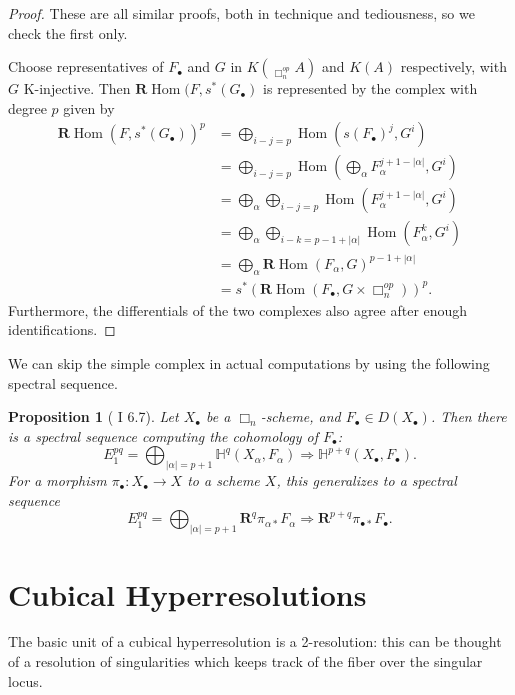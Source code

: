 \documentclass[proquest]{uwthesis}[2014/11/13]
\newtheorem{prop}[theorem]{Proposition}
\theoremstyle{definition}
\DeclareMathOperator{\Diag}{\underline{Diag}}
\DeclareMathOperator{\Hom}{Hom}
\newcommand{\HH}{\mathbb{H}}
\newcommand{\bR}{\textbf{R}}
\begin{document}
\begin{proof}
	These are all similar proofs, both in technique and tediousness, so we check the first only.
	
	Choose representatives of $F_\bullet$ and $G$ in $K(\Diag_{\Box_n^{op}} A)$ and $K(A)$ respectively, with $G$ K-injective.
	Then $\bR \Hom(F, s^* (G_\bullet)$ is represented by the complex with degree $p$ given by
	\begin{align*}
		\bR \Hom(F, s^* (G_\bullet))^p &= \bigoplus_{i-j = p} \Hom(s(F_\bullet)^j, G^i) \\
		&= \bigoplus_{i-j = p} \Hom(\bigoplus_\alpha F_\alpha^{j + 1 - |\alpha|}, G^i) \\
		&= \bigoplus_\alpha \bigoplus_{i-j = p} \Hom(F_\alpha^{j + 1 - |\alpha|}, G^i) \\
		&= \bigoplus_\alpha \bigoplus_{i-k = p - 1 + |\alpha|} \Hom(F_\alpha^k, G^i) \\
		&= \bigoplus_\alpha \bR \Hom(F_\alpha, G)^{p-1+|\alpha|} \\
		&= s^* (\bR \Hom(F_\bullet, G \times \Box_n^{op}))^p.
	\end{align*}
	Furthermore, the differentials of the two complexes also agree after enough identifications.
\end{proof}

We can skip the simple complex in actual computations by using the following spectral sequence.

\begin{prop}[\cite{Guillen1988} I 6.7]
	\label{prp:cubicalcohospecseq}
	Let $X_\bullet$ be a $\Box_n$-scheme, and $F_\bullet \in D(X_\bullet)$.
	Then there is a spectral sequence computing the cohomology of $F_\bullet$:
	\[
	E_1^{pq} = \bigoplus_{|\alpha| = p + 1} \HH^q(X_\alpha, F_\alpha) \Rightarrow \HH^{p+q}(X_\bullet, F_\bullet).
	\]
	For a morphism $\pi_\bullet : X_\bullet \rightarrow X$ to a scheme $X$, this generalizes to a spectral sequence
	\[
	E_1^{pq} = \bigoplus_{|\alpha| = p + 1} \bR^q \pi_{\alpha *}F_\alpha \Rightarrow \bR^{p+q} \pi_{\bullet *} F_\bullet.
	\]
\end{prop}

\section{Cubical Hyperresolutions}

The basic unit of a cubical hyperresolution is a 2-resolution: this can be thought of a resolution of singularities which keeps track of the fiber over the singular locus.
\end{document}

